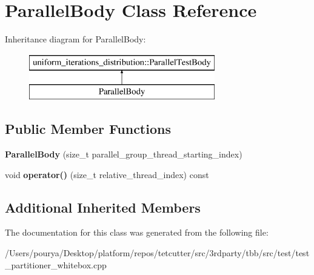 \hypertarget{classParallelBody}{}\section{Parallel\+Body Class Reference}
\label{classParallelBody}
Inheritance diagram for Parallel\+Body\+:\begin{figure}[H]
\begin{center}
\leavevmode
\includegraphics[height=2.000000cm]{classParallelBody}
\end{center}
\end{figure}
\subsection*{Public Member Functions}
\begin{DoxyCompactItemize}
\item 
\hypertarget{classParallelBody_a70bc14f0807db01a4129b1fe570105fd}{}{\bfseries Parallel\+Body} (size\+\_\+t parallel\+\_\+group\+\_\+thread\+\_\+starting\+\_\+index)\label{classParallelBody_a70bc14f0807db01a4129b1fe570105fd}

\item 
\hypertarget{classParallelBody_a95566388e20692c1c0589f0069c69b8e}{}void {\bfseries operator()} (size\+\_\+t relative\+\_\+thread\+\_\+index) const \label{classParallelBody_a95566388e20692c1c0589f0069c69b8e}

\end{DoxyCompactItemize}
\subsection*{Additional Inherited Members}


The documentation for this class was generated from the following file\+:\begin{DoxyCompactItemize}
\item 
/\+Users/pourya/\+Desktop/platform/repos/tetcutter/src/3rdparty/tbb/src/test/test\+\_\+partitioner\+\_\+whitebox.\+cpp\end{DoxyCompactItemize}

